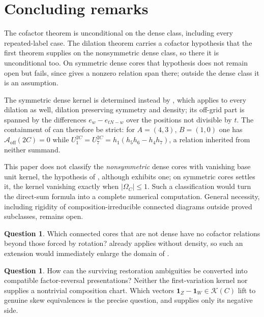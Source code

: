 \documentclass[11pt,a4paper]{amsart}
\numberwithin{equation}{section}
\theoremstyle{plain}
\theoremstyle{definition}
\newtheorem{question}[theorem]{Question}
\newcommand{\K}{\mathcal K}
\begin{document}
\section{Concluding remarks}

The cofactor theorem is unconditional on the dense class, including every
repeated-label case.  The dilation theorem carries a cofactor hypothesis that
the first theorem supplies on the nonsymmetric dense class, so there it is
unconditional too.  On symmetric dense cores that hypothesis does not remain
open but fails, since  gives a nonzero relation
span there; outside the dense class it is an assumption.

The symmetric dense kernel is determined instead by
, which
applies to every dilation as well, dilation preserving symmetry and density;
its off-grid part is spanned by the differences \(e_w-e_{tN-w}\) over the
positions not divisible by \(t\).  The containment of  can
therefore be strict: for \(A=(4,3)\), \(B=(1,0)\) one has
\(\mathcal A_{\mathrm{off}}(2C)=0\) while
\(U_1^{2C}=U_7^{2C}=h_1(h_5h_6-h_4h_7)\), a relation inherited from neither
summand.

This paper does not classify the \emph{nonsymmetric} dense cores with
vanishing base unit kernel, the hypothesis of
, although  exhibits
one; on symmetric cores  settles it, the
kernel vanishing exactly when \(|\Omega_C|\le1\).  Such a classification would
turn the direct-sum formula into a complete numerical computation.  General
necessity, including rigidity of composition-irreducible connected diagrams
outside proved subclasses, remains open.

\begin{question}\label{q:nondense-cores}
Which connected cores that are not dense have no cofactor relations beyond
those forced by rotation?   already applies
without density,
so such an extension would immediately enlarge the domain of
.
\end{question}

\begin{question}\label{q:restoration-charts}
How can the surviving restoration ambiguities be converted into compatible
factor-reversal presentations?  Neither the first-variation kernel nor
 supplies a nontrivial composition chart.
Which vectors \(\mathbf1_Z-\mathbf1_W\in\K(C)\) lift to genuine skew
equivalences is the precise question, and 
supplies only its negative side.
\end{question}
\end{document}
